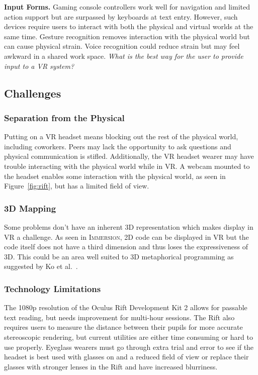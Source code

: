 \documentclass[conference]{IEEEtran}
\begin{document}
\textbf{Input Forms.}
Gaming console controllers work well for navigation and limited action support but are surpassed by keyboards at text entry.
However, such devices require users to interact with both the physical and virtual worlds at the same time.
Gesture recognition removes interaction with the physical world but can cause physical strain.
Voice recognition could reduce strain but may feel awkward in a shared work space.
\emph{What is the best way for the user to provide input to a VR system?}

\subsection{Challenges}

\subsubsection{Separation from the Physical}
Putting on a VR headset means blocking out the rest of the physical world, including coworkers.
Peers may lack the opportunity to ask questions and physical communication is stifled.
Additionally, the VR headset wearer may have trouble interacting with the physical world while in VR.
A webcam mounted to the headset enables some interaction with the physical world, as seen in Figure~\ref{fig:rift}, but has a limited field of view.

\subsubsection{3D Mapping}
Some problems don't have an inherent 3D representation which makes display in VR a challenge.
As seen in \textsc{Immersion}, 2D code can be displayed in VR but the code itself does not have a third dimension and thus loses the expressiveness of 3D.
This could be an area well suited to 3D metaphorical programming as suggested by Ko et al.~\cite{Ko:LearningBarriers}.

\subsubsection{Technology Limitations}

The 1080p resolution of the Oculus Rift Development Kit 2 allows for passable text reading, but needs improvement for multi-hour sessions. 
The Rift also requires users to measure the distance between their pupils for more accurate stereoscopic rendering, but current utilities are either time consuming or hard to use properly.
Eyeglass wearers must go through extra trial and error to see if the headset is best used with glasses on and a reduced field of view or replace their glasses with stronger lenses in the Rift and have increased blurriness.
\end{document}
